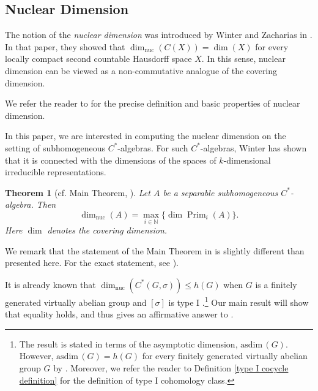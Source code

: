 \documentclass{amsart}
\newtheorem{theorem}{Theorem}[section]
\theoremstyle{definition}
\newcommand{\N}{\mathbb{N}}
\DeclareMathOperator{\Prim}{Prim}
\DeclareMathOperator{\nuc}{nuc}
\newcommand{\dimnuc}{\dim_{\nuc}}
\begin{document}
\subsection{Nuclear Dimension}
The notion of the {\em nuclear dimension} was introduced by Winter and Zacharias in \cite{WZ10}. In that paper, they showed that $\dimnuc (C(X))=\dim(X)$ for every locally compact second countable Hausdorff space $X$. In this sense, nuclear dimension can be viewed as a non-commutative analogue of the covering dimension. 

We refer the reader to \cite{WZ10} for the precise definition and basic properties of nuclear dimension. \par
In this paper, we are interested in computing the nuclear dimension on the setting of subhomogeneous $C^*$-algebras. For such $C^*$-algebras, Winter has shown that it is connected with the dimensions of the spaces of $k$-dimensional irreducible representations.
\begin{theorem}[cf. Main Theorem, \cite{Win04}]\label{dim_nuc_subhomogeneous}
 Let $A$ be a separable subhomogeneous $C^*$-algebra. Then 
\[\dimnuc (A)=\max_{i\in \N}\{\dim \Prim_i(A)\}.\]
Here $\dim$ denotes the covering dimension.
 \end{theorem}
We remark that the statement of the Main Theorem in \cite{Win04} is slightly different than presented here. For the exact statement, see \cite[Thm. 2.7]{paper_untwisted_case}). \par
It is already known that $\dimnuc (C^*(G, \sigma))\leq h(G)$ when $G$ is a finitely generated virtually abelian group and $[\sigma]$ is type I \cite[Prop. 2.14]{BL24}.\footnote{ The result is stated in terms of the asymptotic dimension, $\text{asdim}\,(G)$. However, $\text{asdim}\,(G)=h(G)$ for every finitely generated virtually abelian group $G$ by \cite[Thm. 3.5]{asymp_dim_va_groups}. Moreover, we refer the reader to Definition \ref{type I cocycle definition} for the definition of type I cohomology class.} Our main result will show that equality holds, and thus gives an affirmative answer to \cite[Question 2.15]{BL24}.
\end{document}

